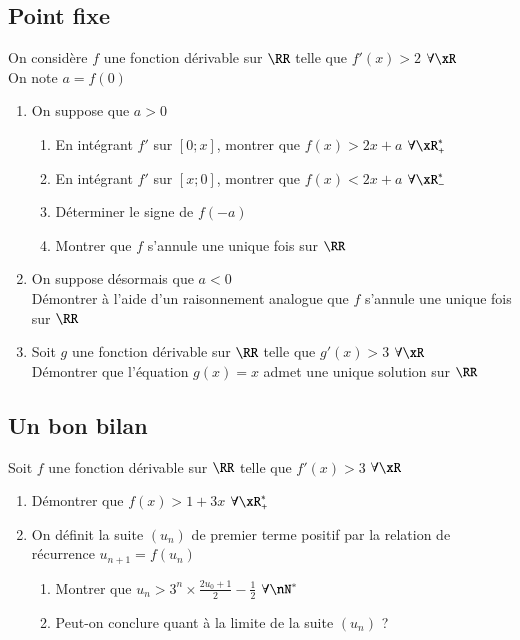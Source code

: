 \documentclass[oneside,12pt]{article}          %
\begin{document}
\subsection{Point fixe}
On considère $f$ une fonction dérivable sur $\RR$ telle que $f'(x)>2$ \quad$\forall\xR$\\
On note $a=f(0)$
\begin{enumerate}
	\item On suppose que $a>0$
	\begin{enumerate}
		\item En intégrant $f'$ sur $[0;x]$, montrer que $f(x)>2x+a$ \quad$\forall\xR_+^*$
		\item En intégrant $f'$ sur $[x;0]$, montrer que $f(x)<2x+a$ \quad$\forall\xR_-^*$
		\item Déterminer le signe de $f(-a)$
		\item Montrer que $f$ s'annule une unique fois sur $\RR$
	\end{enumerate}
	\item On suppose désormais que $a<0$\\
	Démontrer à l'aide d'un raisonnement analogue que $f$ s'annule une unique fois sur $\RR$
	\item Soit $g$ une fonction dérivable sur $\RR$ telle que $g'(x)>3$ \quad$\forall\xR$\\
	Démontrer que l'équation $g(x)=x$ admet une unique solution sur $\RR$
\end{enumerate}



\subsection{Un bon bilan}
Soit $f$ une fonction dérivable sur $\RR$ telle que $f'(x)>3$ \quad$\forall\xR$
\begin{enumerate}
	\item Démontrer que $f(x)>1+3x$ \quad$\forall\xR_+^*$
	\item On définit la suite $(u_n)$ de premier terme positif par la relation de récurrence $u_{n+1}=f(u_n)$
	\begin{enumerate}
		\item Montrer que $u_n>3^n\times\frac{2u_0+1}{2}-\frac{1}{2}$ \quad$\forall\nN^*$
		\item Peut-on conclure quant à la limite de la suite $(u_n)$ ?
	\end{enumerate}
\end{enumerate}
\end{document}
